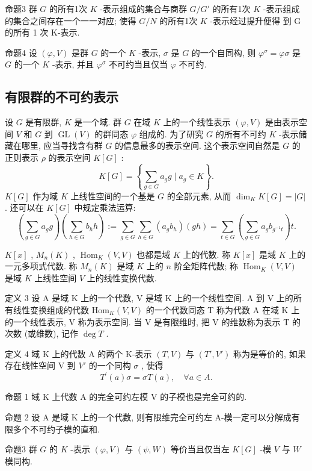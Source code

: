 \documentclass[]{article}
\begin{document}
命题3 群 $G$ 的所有1次 $K$ -表示组成的集合与商群 $G / G'$ 的所有1次 $K$ -表示组成的集合之间存在一个一一对应; 使得 $G / N$ 的所有1次 $K$ -表示经过提升便得 到 G 的所有 1 次 K-表示. 

命题4 设 $(\varphi, V)$ 是群 $G$ 的一个 $K$ -表示, $\sigma$ 是 $G$ 的一个自同构, 则 $\varphi^{\sigma} = \varphi \sigma$ 是 $G$ 的一个 $K$ -表示, 并且 $\varphi^{\sigma}$ 不可约当且仅当 $\varphi$ 不可约. 

\subsection{有限群的不可约表示}

设 $G$ 是有限群, $K$ 是一个域. 群 $G$ 在域 $K$ 上的一个线性表示 $(\varphi, V)$ 是由表示空间 $V$ 和 $G$ 到 $\operatorname{GL}(V)$ 的群同态 $\varphi$ 组成的. 为了研究 $G$ 的所有不可约 $K$ -表示储藏在哪里, 应当寻找含有群 $G$ 的信息最多的表示空间. 这个表示空间自然是 $G$ 的正则表示 $\rho$ 的表示空间 $K[G]$ : $$
K [ G ] = \left\{\sum_ {g \in G} a _ {g} g \mid a _ {g} \in K \right\}.
$$$K[G]$ 作为域 $K$ 上线性空间的一个基是 $G$ 的全部元素, 从而 $\dim_K K[G] = |G|$ . 还可以在 $K[G]$ 中规定乘法运算:$$
\left(\sum_ {g \in G} a _ {g} g\right) \left(\sum_ {h \in G} b _ {h} h\right) := \sum_ {g \in G} \sum_ {h \in G} \left(a _ {g} b _ {h}\right) (g h) = \sum_ {t \in G} \left(\sum_ {g \in G} a _ {g} b _ {g ^ {- 1} t}\right) t.
$$

$K[x]$ , $M_{n}(K)$ , $\operatorname{Hom}_{K}(V, V)$ 也都是域 $K$ 上的代数. 称 $K[x]$ 是域 $K$ 上的一元多项式代数. 称 $M_{n}(K)$ 是域 $K$ 上的 $n$ 阶全矩阵代数; 称 $\operatorname{Hom}_{K}(V, V)$ 是域 $K$ 上线性空间 $V$ 上的线性变换代数. 

定义 3 设 A 是域 K 上的一个代数, V 是域 K 上的一个线性空间. A 到 V 上的所有线性变换组成的代数 $\mathrm{Hom}_{K}(V,V)$ 的一个代数同态 T 称为代数 A 在域 K 上的一个线性表示, V 称为表示空间. 当 V 是有限维时, 把 V 的维数称为表示 T 的次数 (或维数), 记作 $\deg T$ . 

定义 4 域 K 上的代数 A 的两个 K-表示 $(T, V)$ 与 $(T', V')$ 称为是等价的, 如果存在线性空间 V 到 $V'$ 的一个同构 $\sigma$ , 使得$$
T ^ {\prime} (a) \sigma = \sigma T (a), \quad \forall a \in A. 
$$

命题 1 域 K 上代数 A 的完全可约左模 V 的子模也是完全可约的. 

命题 2 设 A 是域 K 上的一个代数, 则有限维完全可约左 A-模一定可以分解成有限多个不可约子模的直和. 

命题3 群 $G$ 的 $K$ -表示 $(\varphi, V)$ 与 $(\psi, W)$ 等价当且仅当左 $K[G]$ -模 $V$ 与 $W$ 模同构. 
\end{document}
